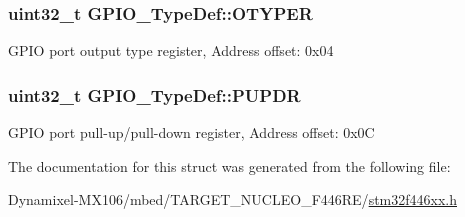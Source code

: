 \subsubsection[{\texorpdfstring{O\+T\+Y\+P\+ER}{OTYPER}}]{ uint32\+\_\+t G\+P\+I\+O\+\_\+\+Type\+Def\+::\+O\+T\+Y\+P\+ER}\hypertarget{struct_g_p_i_o___type_def_a910885e4d881c3a459dd11640237107f}{}\label{struct_g_p_i_o___type_def_a910885e4d881c3a459dd11640237107f}
G\+P\+IO port output type register, Address offset\+: 0x04 
\subsubsection[{\texorpdfstring{P\+U\+P\+DR}{PUPDR}}]{ uint32\+\_\+t G\+P\+I\+O\+\_\+\+Type\+Def\+::\+P\+U\+P\+DR}\hypertarget{struct_g_p_i_o___type_def_a44ada3bfbe891e2efc1e06bda4c8014e}{}\label{struct_g_p_i_o___type_def_a44ada3bfbe891e2efc1e06bda4c8014e}
G\+P\+IO port pull-\/up/pull-\/down register, Address offset\+: 0x0C 

The documentation for this struct was generated from the following file\+:\begin{DoxyCompactItemize}
\item 
Dynamixel-\/\+M\+X106/mbed/\+T\+A\+R\+G\+E\+T\+\_\+\+N\+U\+C\+L\+E\+O\+\_\+\+F446\+R\+E/\hyperlink{stm32f446xx_8h}{stm32f446xx.\+h}\end{DoxyCompactItemize}
